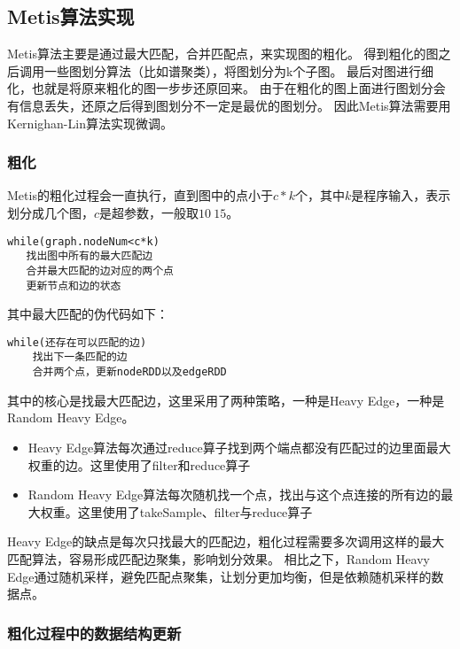 \subsection{Metis算法实现}

Metis算法主要是通过最大匹配，合并匹配点，来实现图的粗化。
得到粗化的图之后调用一些图划分算法（比如谱聚类），将图划分为k个子图。
最后对图进行细化，也就是将原来粗化的图一步步还原回来。
由于在粗化的图上面进行图划分会有信息丢失，还原之后得到图划分不一定是最优的图划分。
因此Metis算法需要用Kernighan-Lin算法实现微调。

\subsubsection{粗化}

Metis的粗化过程会一直执行，直到图中的点小于$c*k$个，其中$k$是程序输入，表示划分成几个图，$c$是超参数，一般取$10~15$。

\begin{lstlisting}
while(graph.nodeNum<c*k)
   找出图中所有的最大匹配边
   合并最大匹配的边对应的两个点
   更新节点和边的状态
\end{lstlisting}

其中最大匹配的伪代码如下：

\begin{lstlisting}
while(还存在可以匹配的边)
    找出下一条匹配的边
    合并两个点，更新nodeRDD以及edgeRDD
\end{lstlisting}

其中的核心是找最大匹配边，这里采用了两种策略，一种是Heavy Edge，一种是Random Heavy Edge。
\begin{itemize}
    \item Heavy Edge算法每次通过reduce算子找到两个端点都没有匹配过的边里面最大权重的边。这里使用了filter和reduce算子
    \item Random Heavy Edge算法每次随机找一个点，找出与这个点连接的所有边的最大权重。这里使用了takeSample、filter与reduce算子
\end{itemize}

Heavy Edge的缺点是每次只找最大的匹配边，粗化过程需要多次调用这样的最大匹配算法，容易形成匹配边聚集，影响划分效果。
相比之下，Random Heavy Edge通过随机采样，避免匹配点聚集，让划分更加均衡，但是依赖随机采样的数据点。

\subsubsection{粗化过程中的数据结构更新}

